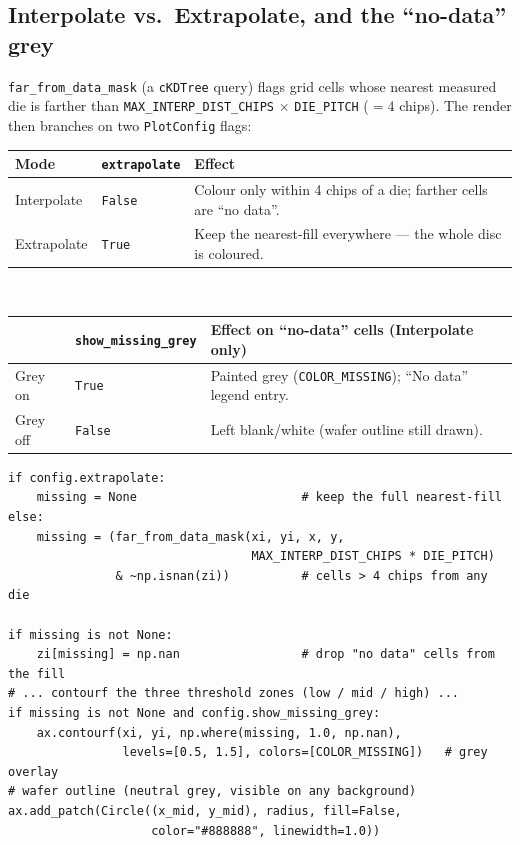 \documentclass[11pt,a4paper]{article}
\newcommand{\code}[1]{\texttt{#1}}
\begin{document}
\subsection{Interpolate vs.\ Extrapolate, and the ``no-data'' grey}
\code{far_from_data_mask} (a \code{cKDTree} query) flags grid cells whose nearest
measured die is farther than \code{MAX_INTERP_DIST_CHIPS} $\times$
\code{DIE_PITCH} ($=4$ chips). The render then branches on two
\code{PlotConfig} flags:

\begin{center}\small
\begin{tabular}{@{}lll@{}}
\toprule
\textbf{Mode} & \texttt{extrapolate} & \textbf{Effect} \\
\midrule
Interpolate & \code{False} & Colour only within 4 chips of a die; farther cells are ``no data''. \\
Extrapolate & \code{True} & Keep the nearest-fill everywhere --- the whole disc is coloured. \\
\bottomrule
\end{tabular}\\[4pt]
\begin{tabular}{@{}lll@{}}
\toprule
\textbf{} & \texttt{show\_missing\_grey} & \textbf{Effect on ``no-data'' cells (Interpolate only)} \\
\midrule
Grey on & \code{True} & Painted grey (\code{COLOR_MISSING}); ``No data'' legend entry. \\
Grey off & \code{False} & Left blank/white (wafer outline still drawn). \\
\bottomrule
\end{tabular}
\end{center}

\begin{lstlisting}[caption={The interpolate/extrapolate + grey decision in draw\_wafer\_ax.}]
if config.extrapolate:
    missing = None                       # keep the full nearest-fill
else:
    missing = (far_from_data_mask(xi, yi, x, y,
                                  MAX_INTERP_DIST_CHIPS * DIE_PITCH)
               & ~np.isnan(zi))          # cells > 4 chips from any die

if missing is not None:
    zi[missing] = np.nan                 # drop "no data" cells from the fill
# ... contourf the three threshold zones (low / mid / high) ...
if missing is not None and config.show_missing_grey:
    ax.contourf(xi, yi, np.where(missing, 1.0, np.nan),
                levels=[0.5, 1.5], colors=[COLOR_MISSING])   # grey overlay
# wafer outline (neutral grey, visible on any background)
ax.add_patch(Circle((x_mid, y_mid), radius, fill=False,
                    color="#888888", linewidth=1.0))
\end{lstlisting}
\end{document}
